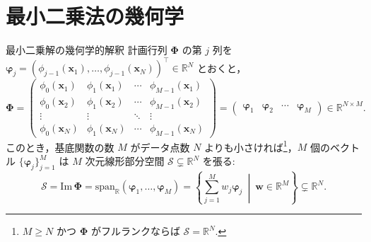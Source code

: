 \documentclass[uplatex,11pt,dvipdfmx,aspectratio=169,unicode,t]{beamer}
\numberwithin{equation}{section}
\newcommand{\BR}{\mathbb{R}}
\newcommand{\CS}{\mathcal{S}}
\newcommand{\bs}[1]{\boldsymbol{#1}}
\newcommand{\1}{\bs{1}}
\newcommand{\0}{\bs{0}}
\begin{document}
\section{最小二乗法の幾何学}

\begin{frame}{最小二乗解の幾何学的解釈}
    計画行列 $\bs{\Phi}$ の第 $j$ 列を $\bs{\varphi}_{j} = (\phi_{j-1}(\bs{x}_{1}),\ldots,\phi_{j-1}(\bs{x}_{N}))^{\top} \in \BR^{N}$ とおくと，
    \begin{equation}
        \bs{\Phi} = \begin{pmatrix}
            \phi_{0}(\bs{x}_{1}) & \phi_{1}(\bs{x}_{1}) & \cdots & \phi_{M-1}(\bs{x}_{1}) \\
            \phi_{0}(\bs{x}_{2}) & \phi_{1}(\bs{x}_{2}) & \cdots & \phi_{M-1}(\bs{x}_{2}) \\
            \vdots & \vdots & \ddots & \vdots \\
            \phi_{0}(\bs{x}_{N}) & \phi_{1}(\bs{x}_{N}) & \cdots & \phi_{M-1}(\bs{x}_{N})
        \end{pmatrix} = \begin{pmatrix}
            \bs{\varphi}_{1} & \bs{\varphi}_{2} & \cdots & \bs{\varphi}_{M}
        \end{pmatrix} \in \BR^{N \times M}.
    \end{equation}
    このとき，基底関数の数 $M$ がデータ点数 $N$ よりも小さければ\footnote{$M \ge N$ かつ $\bs{\Phi}$ がフルランクならば $\CS = \BR^{N}$.}，$M$ 個のベクトル $\{\bs{\varphi}_{j}\}_{j=1}^{M}$ は $M$ 次元線形部分空間 $\CS \subsetneq \BR^{N}$ を張る:
    \begin{equation}
        \CS = \text{Im}\, \bs{\Phi} = \text{span}_{\BR}(\bs{\varphi}_{1},\ldots,\bs{\varphi}_{M}) = \left\{\sum_{j=1}^{M} w_{j} \bs{\varphi}_{j} \ \middle|\ \bs{w} \in \BR^{M}\right\} \subsetneq \BR^{N}.
    \end{equation}    
\end{frame}
\end{document}
